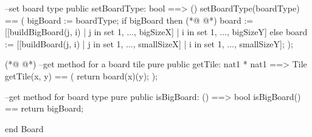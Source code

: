 \begin{vdmpp}[breaklines=true]
  --set board type
  public setBoardType: bool ==> () 
  setBoardType(boardType) == (
   bigBoard := boardType;
   if bigBoard then
(*@
\label{getTile:69}
@*)
     board := [[buildBigBoard(j, i) | j in set {1, ..., bigSizeX}] |  i in set {1, ..., bigSizeY}]
    else
     board := [[buildBoard(j, i) | j in set {1, ..., smallSizeX}] |  i in set {1, ..., smallSizeY}];
  );
  
(*@
\label{isBigBoard:74}
@*)
  --get method for a board tile
  pure public getTile: nat1 * nat1 ==> Tile
  getTile(x, y) == (
    return board(x)(y);
  );
  
  --get method for board type
  pure public isBigBoard: () ==> bool
  isBigBoard() == return bigBoard;
        
end Board
\end{vdmpp}
